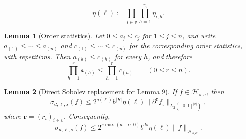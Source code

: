 \documentclass[10pt,a4paper]{amsart}
\newtheorem{lemma}{Lemma}
\newcommand{\abs}[1]{\lvert #1\rvert}
\newcommand{\norm}[1]{\lVert #1\rVert}
\begin{document}
\begin{equation}\label{eq:eta-block}
 \eta(\boldsymbol\ell)
 :=\prod_{i\in v}\prod_{h=1}^{r_i}\eta_{i,h}.
\end{equation}

\begin{lemma}[Order statistics]\label{lem:order-statistics}
Let $0\le a_j\le c_j$ for $1\le j\le n$, and write
$a_{(1)}\le\cdots\le a_{(n)}$ and
$c_{(1)}\le\cdots\le c_{(n)}$ for the corresponding order statistics, with
repetitions.  Then $a_{(h)}\le c_{(h)}$ for every $h$, and therefore
\[
 \prod_{h=1}^r a_{(h)}\le\prod_{h=1}^r c_{(h)}
 \qquad(0\le r\le n).
\]
\end{lemma}

\begin{lemma}[Direct Sobolev replacement for Lemma 9]\label{lem:block-decay}
If $f\in\mathcal H_{s,\alpha}$, then
\begin{equation}\label{eq:sobolev-block-local}
 \sigma_{d,\boldsymbol\ell,s}(f)
 \le 2^{q(\boldsymbol\ell)}b^{\abs K}
      \eta(\boldsymbol\ell)
      \norm{\partial^{\boldsymbol r}f_v}_{L_2([0,1]^{\abs v})},
\end{equation}
where $\boldsymbol r=(r_i)_{i\in v}$.  Consequently,
\begin{equation}\label{eq:sobolev-block}
 \sigma_{d,\boldsymbol\ell,s}(f)
 \le 2^{s\max(d-\alpha,0)}b^{ds}
      \eta(\boldsymbol\ell)\norm f_{\mathcal H_{s,\alpha}}.
\end{equation}
\end{lemma}
\end{document}
